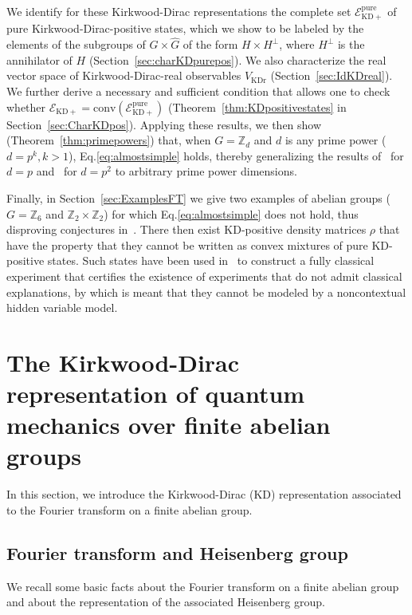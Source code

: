 \documentclass[a4paper, notitlepage, 11pt]{article}
\numberwithin{equation}{section}
\newcommand{\mcl}[1]{\ensuremath{\mathcal{#1}}}
\newcommand{\EcalKDC}{{\mcl E}_{\mathrm{KD+}}}
\newcommand{\EcalKDCpu}{{\mcl E}_{\mathrm{KD+}}^{\mathrm{pure}}}
\newcommand{\Z}{\mathbb{Z}}
\newcommand{\conv}[1]{\mathrm{conv}\left(#1\right)}
\newcommand{\VR}{V_{\mathrm{KDr}}}
\begin{document}
We identify for these Kirkwood-Dirac representations the complete set $\EcalKDCpu$ of pure Kirkwood-Dirac-positive states, which we show to be labeled by the elements of the subgroups of $G\times \hat G$ of the form $H\times H^{\perp}$, where $ H^\perp$ is the annihilator of $H$ (Section~\ref{sec:charKDpurepos}). We also characterize the real vector space of  Kirkwood-Dirac-real observables $\VR$ (Section~\ref{sec:IdKDreal}).   We further derive a necessary and sufficient condition that allows one to check whether $\EcalKDC = \conv{\EcalKDCpu}$ (Theorem~\ref{thm:KDpositivestates} in Section~\ref{sec:CharKDpos}).  Applying these results, we then show (Theorem~\ref{thm:primepowers}) that, when $G=\Z_{d}$ and $d$ is any prime power ($d=p^k, k > 1$), Eq.\eqref{eq:almostsimple} holds, thereby generalizing the results of~\cite{langrenez2023characterizing2} for $d=p$  and~\cite{Yang_2024} for $d=p^2$ to arbitrary prime power dimensions.

Finally, in Section~\ref{sec:ExamplesFT} we give two examples of abelian groups ($G=\Z_6$ and $\Z_2\times \Z_2$) for which Eq.\eqref{eq:almostsimple} does not hold, thus disproving conjectures in~\cite{Yang_2024,xu2024a}. There then exist KD-positive density matrices $\rho$ that have the property that they cannot be written as convex mixtures of pure KD-positive states. Such states have been used in~\cite{thio2024} to construct a fully classical experiment that certifies the existence of experiments that do not admit classical explanations, by which is meant that they cannot be modeled by a noncontextual hidden variable model. 

\section{The Kirkwood-Dirac representation of quantum mechanics over finite abelian groups}
\label{sec:KDfinitegroups}
In this section,  we introduce the Kirkwood-Dirac (KD) representation associated to the Fourier transform on a finite abelian group. 

\subsection{Fourier transform and Heisenberg group}\label{sec:Settings}
We recall some basic facts about the Fourier transform on a finite abelian group and about the representation of the associated Heisenberg group.
\end{document}
